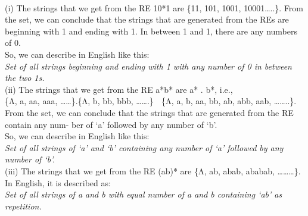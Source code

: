 \begin{quote}
\footnotesize
\end{quote}
\!\!\!\!\!\!\!\!\!\!\!\!\!\!\!\begin{solution}\\

\noindent\!\!\!\!\!\!\!\!\!\!(i)	The strings that we get from the RE 10*1 are \{11, 101, 1001, 10001…..\}. From the set, we can conclude that the strings that are generated from the REs are beginning with 1 and ending with 1. In between 1 and 1, there are any numbers of 0.\\
\indent So, we can describe in English like this:\\
\indent \emph{Set of all strings beginning and ending with 1 with any number of 0 in between the two 1s.}\\
\indent\!\!\!\!\!\!\!\!\!\!\!\!\!\!\!\!\!(ii)	The strings that we get from the RE a*b* are a* . b*, i.e.,\\

\indent\indent \{Λ, a, aa, aaa, ……\}.\{Λ, b, bb, bbb, …….\}  \{Λ, a, b, aa, bb, ab, abb, aab, ……..\}.\\

\indent From the set, we can conclude that the strings that are generated from the RE contain any num- ber of ‘a’ followed by any number of ‘b’.\\
\indent So, we can describe in English like this:\\

\indent \indent \emph{Set of all strings of ‘a’ and ‘b’ containing any number of ‘a’ followed by any number of ‘b’.}\\

\noindent\!\!\!\!\!\!\!\!\!\!(iii)	The strings that we get from the RE (ab)* are \{Λ, ab, abab, ababab, ………\}.\\
\indent In English, it is described as:\\

\indent \emph{Set of all strings of a and b with equal number of a and b containing ‘ab’ as repetition.}\\


\end{solution}
